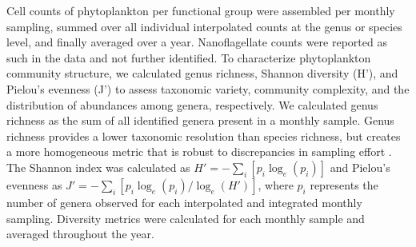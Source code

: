 \documentclass[draft]{agujournal2019}
\begin{document}
    Cell counts of phytoplankton per functional group were assembled per monthly sampling, summed over all individual interpolated counts at the genus or species level, and finally averaged over a year. Nanoflagellate counts were reported as such in the data and not further identified. To characterize phytoplankton community structure, we calculated genus richness, Shannon diversity (H'), and Pielou’s evenness (J') to assess taxonomic variety, community complexity, and the distribution of abundances among genera, respectively. We calculated genus richness as the sum of all identified genera present in a monthly sample. Genus richness provides a lower taxonomic resolution than species richness, but creates a more homogeneous metric that is robust to discrepancies in sampling effort \cite{ptacnik_diversity_2008, de2020higher}. The Shannon index was calculated as $H' = -\sum_i [p_i \log_{e}(p_i)]$ and Pielou's evenness as $J' = -\sum_i[ p_i \log_{e}( p_i )/\log_{e}(H')]$, where $p_i$ represents the number of genera observed for each interpolated and integrated monthly sampling. Diversity metrics were calculated for each monthly sample and averaged throughout the year. 

      
\end{document}
